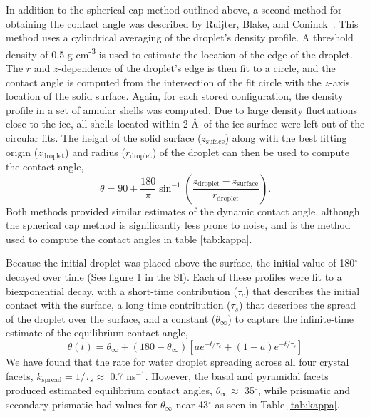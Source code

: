 \documentclass[aps,jcp,preprint,showpacs,superscriptaddress,groupedaddress]{revtex4}  %
\begin{document}
In addition to the spherical cap method outlined above, a second
method for obtaining the contact angle was described by Ruijter,
Blake, and Coninck~\cite{Ruijter99}.  This method uses a cylindrical
averaging of the droplet's density profile.  A threshold density of
0.5 g cm\textsuperscript{-3} is used to estimate the location of the
edge of the droplet.  The $r$ and $z$-dependence of the droplet's edge
is then fit to a circle, and the contact angle is computed from the
intersection of the fit circle with the $z$-axis location of the solid
surface.  Again, for each stored configuration, the density profile in
a set of annular shells was computed. Due to large density
fluctuations close to the ice, all shells located within 2 \AA\ of the
ice surface were left out of the circular fits.  The height of the
solid surface ($z_\mathrm{suface}$) along with the best fitting origin
($z_\mathrm{droplet}$) and radius ($r_\mathrm{droplet}$) of the
droplet can then be used to compute the contact angle,
\begin{equation}
\theta =  90 + \frac{180}{\pi} \sin^{-1}\left(\frac{z_\mathrm{droplet} -
  z_\mathrm{surface}}{r_\mathrm{droplet}} \right).
\end{equation}
Both methods provided similar estimates of the dynamic contact angle,
although the spherical cap method is significantly less prone to
noise, and is the method used to compute the contact angles in table
\ref{tab:kappa}.

Because the initial droplet was placed above the surface, the initial
value of 180$^{\circ}$ decayed over time (See figure 1 in the
SI).  Each of these profiles were fit to a
biexponential decay, with a short-time contribution ($\tau_c$) that
describes the initial contact with the surface, a long time
contribution ($\tau_s$) that describes the spread of the droplet over
the surface, and a constant ($\theta_\infty$) to capture the
infinite-time estimate of the equilibrium contact angle,
\begin{equation}
\theta(t) = \theta_\infty +  (180-\theta_\infty) \left[ a e^{-t/\tau_c} +
  (1-a) e^{-t/\tau_s}  \right]
\end{equation}
We have found that the rate for water droplet spreading across all
four crystal facets, $k_\mathrm{spread} = 1/\tau_s \approx$ 0.7
ns$^{-1}$. However, the basal and pyramidal facets produced estimated
equilibrium contact angles, $\theta_\infty \approx$ 35$^{\circ}$, while
prismatic and secondary prismatic had values for $\theta_\infty$ near
43$^{\circ}$ as seen in Table \ref{tab:kappa}.
\end{document}
